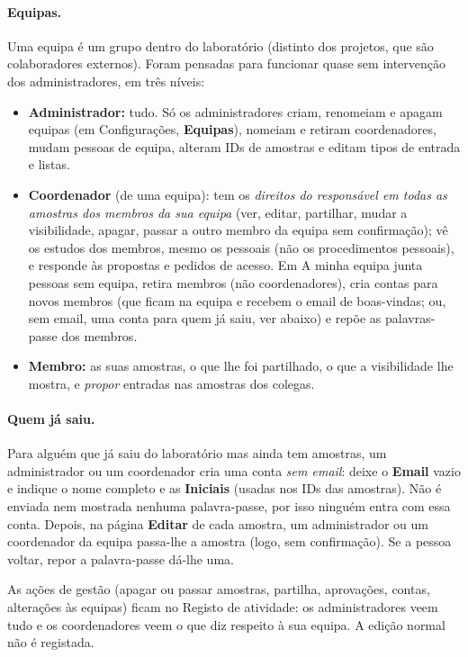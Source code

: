 \documentclass[11pt,a4paper]{article}
\newcommand{\ui}[1]{\textsf{\textbf{#1}}}
\newcommand{\menu}[1]{\textsf{#1}}
\begin{document}
\paragraph{Equipas.} Uma equipa é um grupo dentro do laboratório (distinto dos
projetos, que são colaboradores externos). Foram pensadas para funcionar quase
sem intervenção dos administradores, em três níveis:
\begin{itemize}
  \item \textbf{Administrador:} tudo. Só os administradores criam, renomeiam e
        apagam equipas (em \menu{Configurações}, \ui{Equipas}), nomeiam e
        retiram coordenadores, mudam pessoas de equipa, alteram IDs de amostras
        e editam tipos de entrada e listas.
  \item \textbf{Coordenador} (de uma equipa): tem os \emph{direitos do
        responsável em todas as amostras dos membros da sua equipa} (ver, editar,
        partilhar, mudar a visibilidade, apagar, passar a outro membro da equipa
        sem confirmação); vê os estudos dos membros, mesmo os pessoais (não os
        procedimentos pessoais), e responde às propostas e pedidos de acesso. Em
        \menu{A minha equipa} junta pessoas sem equipa, retira membros (não
        coordenadores), cria contas para novos membros (que ficam na equipa e
        recebem o email de boas-vindas; ou, sem email, uma conta para quem já
        saiu, ver abaixo) e repõe as palavras-passe dos membros.
  \item \textbf{Membro:} as suas amostras, o que lhe foi partilhado, o que a
        visibilidade lhe mostra, e \emph{propor} entradas nas amostras dos
        colegas.
\end{itemize}
\paragraph{Quem já saiu.} Para alguém que já saiu do laboratório mas ainda tem
amostras, um administrador ou um coordenador cria uma conta \emph{sem email}:
deixe o \ui{Email} vazio e indique o nome completo e as \ui{Iniciais} (usadas nos
IDs das amostras). Não é enviada nem mostrada nenhuma palavra-passe, por isso
ninguém entra com essa conta. Depois, na página \ui{Editar} de cada amostra, um
administrador ou um coordenador da equipa passa-lhe a amostra (logo, sem
confirmação). Se a pessoa voltar, repor a palavra-passe dá-lhe uma.

As ações de gestão (apagar ou passar amostras, partilha, aprovações, contas,
alterações às equipas) ficam no \menu{Registo de atividade}: os administradores
veem tudo e os coordenadores veem o que diz respeito à sua equipa. A edição
normal não é registada.
\end{document}
